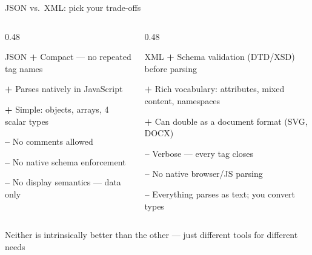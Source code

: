\documentclass[9pt,aspectratio=169]{beamer}
\begin{document}
\begin{frame}{JSON vs.\ XML: pick your trade-offs}
    \begin{columns}[T]
        \begin{column}{0.48\textwidth}
            \begin{block}{JSON}
                \small
                \textbf{+} Compact --- no repeated tag names

                \textbf{+} Parses natively in JavaScript

                \textbf{+} Simple: objects, arrays, 4 scalar types

                \textbf{--} No comments allowed

                \textbf{--} No native schema enforcement

                \textbf{--} No display semantics --- data only
            \end{block}
        \end{column}
        \begin{column}{0.48\textwidth}
            \begin{block}{XML}
                \small
                \textbf{+} Schema validation (DTD/XSD) before parsing

                \textbf{+} Rich vocabulary: attributes, mixed content, namespaces

                \textbf{+} Can double as a document format (SVG, DOCX)

                \textbf{--} Verbose --- every tag closes

                \textbf{--} No native browser/JS parsing

                \textbf{--} Everything parses as text; you convert types
            \end{block}
        \end{column}
    \end{columns}
    \medskip
    \centering\small Neither is intrinsically better than the other --- just different tools for different needs
\end{frame}
\end{document}
